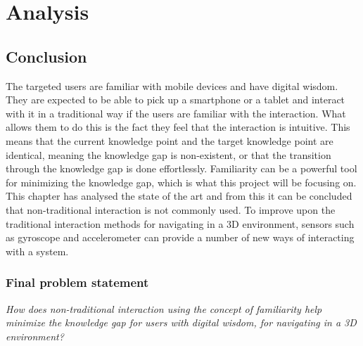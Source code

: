 \chapter{Analysis}







\section{Conclusion}

The targeted users are familiar with mobile devices and have digital wisdom. They are expected to be able to pick up a smartphone or a tablet and interact with it in a traditional way if the users are familiar with the interaction. What allows them to do this is the fact they feel that the interaction is intuitive. This means that the current knowledge point and the target knowledge point are identical, meaning the knowledge gap is non-existent, or that the transition through the knowledge gap is done effortlessly. Familiarity can be a powerful tool for minimizing the knowledge gap, which is what this project will be focusing on. This chapter has  analysed the state of the art and from this it can be concluded that non-traditional interaction is not commonly used. To improve upon the traditional interaction methods for navigating in a 3D environment, sensors such as gyroscope and accelerometer can provide a number of new ways of interacting with a system.

\subsection{Final problem statement}
\textit{How does non-traditional interaction using the concept of familiarity help minimize the knowledge gap for users with digital wisdom, for navigating in a 3D environment?}\label{FPS}

